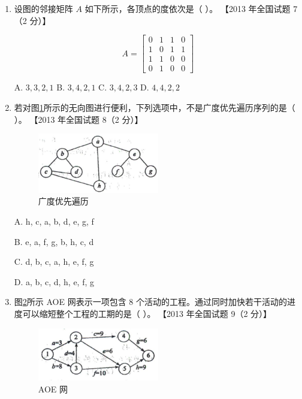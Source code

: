 \documentclass[lang=cn,newtx,10pt,scheme=chinese]{../../elegantbook}
\begin{document}
\begin{enumerate}
        \item 设图的邻接矩阵 $A$ 如下所示，各顶点的度依次是（ ）。  
        【2013 年全国试题 7（2 分）】  

        \[
        A = 
        \begin{bmatrix}
        0 & 1 & 1 & 0 \\
        1 & 0 & 1 & 1 \\
        1 & 1 & 0 & 0 \\
        0 & 1 & 0 & 0
        \end{bmatrix}
        \]  

        A. $3, 3, 2, 1$ \quad B. $3, 4, 2, 1$ \quad C. $3, 4, 2, 3$ \quad D. $4, 4, 2, 2$  


        \item 若对图\ref{fig:7-17}所示的无向图进行便利，下列选项中，不是广度优先遍历序列的是（ ）。  
        【2013 年全国试题 8（2 分）】  


        \begin{figure}[h!]
            \centering
            \includegraphics[width=0.5\textwidth]{../../figure/exercisePicPDF/chapter7/7-17.pdf}
            \caption{广度优先遍历}
            \label{fig:7-17}
    \end{figure}
    A. h, c, a, b, d, e, g, f  

    B. e, a, f, g, b, h, c, d 

    C. d, b, c, a, h, e, f, g  

    D. a, b, c, d, h, e, f, g  
    
        \item 图\ref{fig:7-18}所示 AOE 网表示一项包含 8 个活动的工程。通过同时加快若干活动的进度可以缩短整个工程的工期的是（ ）。  
        【2013 年全国试题 9（2 分）】  

        \begin{figure}[h!]
            \centering
            \includegraphics[width=0.5\textwidth]{../../figure/exercisePicPDF/chapter7/7-18.pdf}
            \caption{AOE 网}
            \label{fig:7-18}
    \end{figure}


\end{enumerate}
\end{document}
